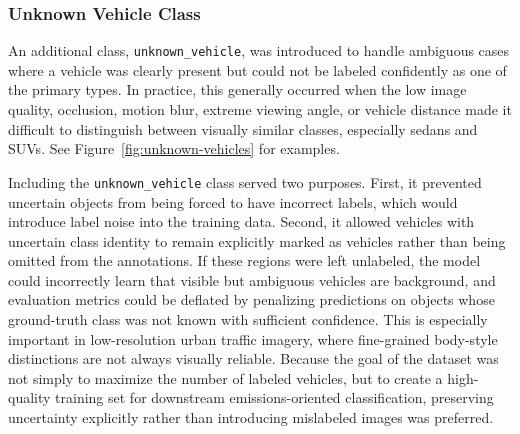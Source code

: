 \subsubsection{Unknown Vehicle Class}
\label{sec:unk-vehicle-class}

An additional class, \verb|unknown_vehicle|, was introduced to handle ambiguous 
cases where a vehicle was clearly present but could not be labeled confidently as
one of the primary types. In practice, this generally occurred when the low image
quality, occlusion, motion blur, extreme viewing angle, or vehicle distance made 
it difficult to distinguish between visually similar classes, especially sedans and
SUVs. See Figure~\ref{fig:unknown-vehicles} for examples.

Including the \verb|unknown_vehicle| class served two purposes. First, it prevented
uncertain objects from being forced to have incorrect labels, which would
introduce label noise into the training data. Second, it allowed vehicles with uncertain
class identity to remain explicitly marked as vehicles rather than being omitted from
the annotations. If these regions were left unlabeled, the model could incorrectly
learn that visible but ambiguous vehicles are background, and evaluation metrics
could be deflated by penalizing predictions on objects whose ground-truth class was
not known with sufficient confidence. This is especially important in low-resolution
urban traffic imagery, where fine-grained body-style distinctions are not always
visually reliable.
Because the goal of the dataset was not simply to maximize the number of labeled 
vehicles, but to create a high-quality training set for downstream emissions-oriented
classification, preserving uncertainty explicitly rather than introducing mislabeled
images was preferred.

